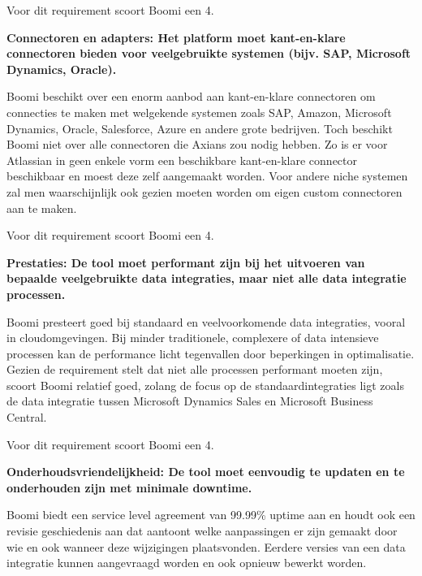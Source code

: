 Voor dit requirement scoort Boomi een 4.


\vspace{\baselineskip}

\textbf{Connectoren en adapters: Het platform moet kant-en-klare connectoren bieden voor veelgebruikte systemen (bijv. SAP, Microsoft Dynamics, Oracle).}
\vspace{\baselineskip}

Boomi beschikt over een enorm aanbod aan kant-en-klare connectoren om connecties te maken met welgekende systemen zoals SAP, Amazon, Microsoft Dynamics, Oracle, Salesforce, Azure en andere grote bedrijven. Toch beschikt Boomi niet over alle connectoren die Axians zou nodig hebben. Zo is er voor Atlassian in geen enkele vorm een beschikbare kant-en-klare connector beschikbaar en moest deze zelf aangemaakt worden. Voor andere niche systemen zal men waarschijnlijk ook gezien moeten worden om eigen custom connectoren aan te maken.  

Voor dit requirement scoort Boomi een 4.


\vspace{\baselineskip}

\textbf{Prestaties: De tool moet performant zijn bij het uitvoeren van bepaalde veelgebruikte data integraties, maar niet alle data integratie processen.}

\vspace{\baselineskip}

Boomi presteert goed bij standaard en veelvoorkomende data integraties, vooral in cloudomgevingen. Bij minder traditionele, complexere of data intensieve processen kan de performance licht tegenvallen door beperkingen in optimalisatie. Gezien de requirement stelt dat niet alle processen performant moeten zijn, scoort Boomi relatief goed, zolang de focus op de standaardintegraties ligt zoals de data integratie tussen Microsoft Dynamics Sales en Microsoft Business Central.

Voor dit requirement scoort Boomi een 4.

\vspace{\baselineskip}

\textbf{Onderhoudsvriendelijkheid: De tool moet eenvoudig te updaten en te onderhouden zijn met minimale downtime.}

\vspace{\baselineskip}

Boomi biedt een service level agreement van 99.99\% uptime aan en houdt ook een revisie geschiedenis aan dat aantoont welke aanpassingen er zijn gemaakt door wie en ook wanneer deze wijzigingen plaatsvonden. Eerdere versies van een data integratie kunnen aangevraagd worden en ook opnieuw bewerkt worden.

